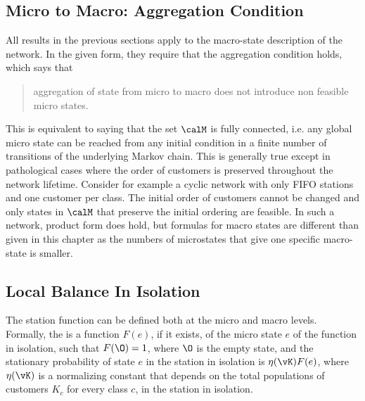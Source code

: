 \begin{petit}
\subsection{Micro to Macro: Aggregation
Condition} \label{sec-aggreg} All results in the
previous sections apply to the macro-state
description of the network. In the given form,
they require that the aggregation condition
holds, which says that
  \begin{quote}
  aggregation of state from
micro to macro does not introduce non feasible
micro states.
 \end{quote}
This is equivalent to saying that the set $\calM$
is fully connected, i.e. any global micro state
can be reached from any initial condition in a
finite number of transitions of the underlying
Markov chain. This is generally true except in
pathological cases where the order of customers
is preserved throughout the network lifetime.
Consider for example a cyclic network with only
FIFO stations and one customer per class. The
initial order of customers cannot be changed and
only states in $\calM$ that preserve the initial
ordering are feasible. In such a network, product
form does hold, but formulas for macro states
are different than given in this chapter as the numbers of microstates that
give one specific macro-state is smaller.


\subsection{Local Balance In Isolation}
The station function can be defined both at the micro and macro
levels. Formally, the  is a
function $F(e)$, if it exists, of the micro state $e$ of the
function in isolation, such that $F(\O)= 1$, where $\O$ is the empty state, and the
stationary probability of state $e$ in the station in isolation
is $\eta(\vK) F(e)$, where $\eta(\vK)$ is a normalizing
constant that depends on the total populations of customers
$K_c$ for every class $c$, in the station in isolation.


\end{petit}
